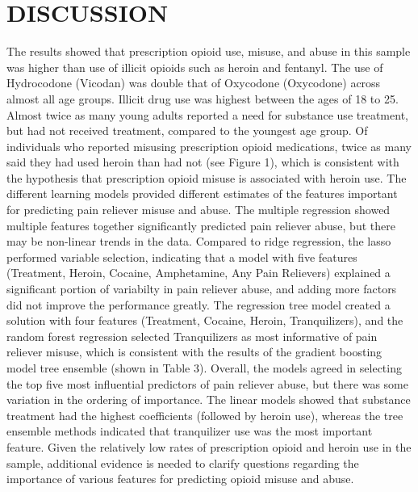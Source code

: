 \documentclass[sigconf]{acmart}
\begin{document}

\section{DISCUSSION}

The results showed that prescription opioid use, misuse, and abuse in this 
sample was higher than use of illicit opioids such as heroin and fentanyl. 
The use of Hydrocodone (Vicodan) was double that of Oxycodone (Oxycodone) 
across almost all age groups. Illicit drug use was highest between the ages 
of 18 to 25. Almost twice as many young adults reported a need for substance 
use treatment, but had not received treatment, compared to the youngest age 
group. Of individuals who reported misusing prescription opioid medications, 
twice as many said they had used heroin than had not (see Figure 1), which is 
consistent with the hypothesis that prescription opioid misuse is associated 
with heroin use. The different learning models provided different estimates 
of the features important for predicting pain reliever misuse and abuse. 
The multiple regression showed multiple features together significantly 
predicted pain reliever abuse, but there may be non-linear trends in the data.
Compared to ridge regression, the lasso performed variable selection, 
indicating that a model with five features (Treatment, Heroin, Cocaine, 
Amphetamine, Any Pain Relievers) explained a significant portion of
variabilty in pain reliever abuse, and adding more factors did not improve
the performance greatly. The regression tree model created a solution
with four features (Treatment, Cocaine, Heroin, Tranquilizers), and the
random forest regression selected Tranquilizers as most informative of
pain reliever misuse, which is consistent with the results of the gradient
boosting model tree ensemble (shown in Table 3). Overall, the models 
agreed in selecting the top five most influential predictors of pain
reliever abuse, but there was some variation in the ordering of importance. 
The linear models showed that substance treatment had the highest
coefficients (followed by heroin use), whereas the tree ensemble methods
indicated that tranquilizer use was the most important feature. Given the 
relatively low rates of prescription opioid and heroin use in the sample, 
additional evidence is needed to clarify questions regarding the importance
of various features for predicting opioid misuse and abuse. 
 
\end{document}
